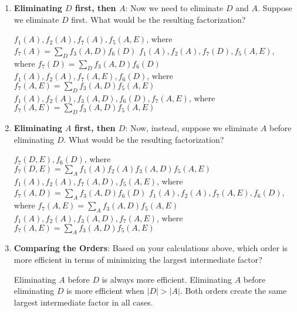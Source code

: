 \documentclass[12pt,letterpaper, onecolumn]{exam}
\begin{document}
\begin{questions}
\begin{enumerate}[label=(\alph*)]
    \item \textbf{Eliminating $D$ first, then $A$}:  
    Now we need to eliminate \( D \) and \( A \). Suppose we eliminate \( D \) first. What would be the resulting factorization?
    \begin{choices}
        \choice \( f_1(A), f_2(A), f_7(A), f_5(A,E) \), where \( f_7(A) = \sum_D f_3(A, D) f_6(D) \)
        \choice \( f_1(A), f_2(A), f_7(D), f_5(A,E) \), where \( f_7(D) = \sum_D f_3(A, D) f_6(D) \)
        \choice \( f_1(A), f_2(A), f_7(A, E), f_6(D) \), where \( f_7(A, E) = \sum_D f_3(A, D) f_5(A, E) \)
        \choice \( f_1(A), f_2(A), f_3(A,D), f_6(D), f_7(A, E) \), where \( f_7(A, E) = \sum_D f_3(A, D) f_5(A, E) \)
    \end{choices}

    \item \textbf{Eliminating \( A \) first, then \( D \)}:  
    Now, instead, suppose we eliminate \( A \) before eliminating $D$. What would be the resulting factorization?
    \begin{choices}
        \choice \( f_7(D, E), f_6(D) \), where \( f_7(D, E) = \sum_A f_1(A) f_2(A) f_3(A, D) f_5(A, E) \)
        \choice \( f_1(A), f_2(A), f_7(A, D), f_5(A, E) \), where \( f_7(A, D) = \sum_A f_3(A, D) f_6(D) \)
        \choice \( f_1(A), f_2(A), f_7(A, E), f_6(D) \), where \( f_7(A, E) = \sum_A f_3(A, D) f_5(A, E) \)
        \choice \( f_1(A), f_2(A), f_3(A,D), f_7(A, E) \), where \( f_7(A, E) = \sum_A f_3(A, D) f_5(A, E) \)
    \end{choices}

    \item \textbf{Comparing the Orders}:  
    Based on your calculations above, which order is more efficient in terms of minimizing the largest intermediate factor?  
    \begin{choices}
        \choice Eliminating $A$ before $D$ is always more efficient.
        \choice Eliminating \( A \) before eliminating $D$ is more efficient when \( |D| > |A| \).
        \choice Both orders create the same largest intermediate factor in all cases.
    \end{choices}
\end{enumerate}

\begin{solution}
    \begin{parts}
        \part   
        \part 

\end{parts}
\end{solution}
\end{questions}
\end{document}
